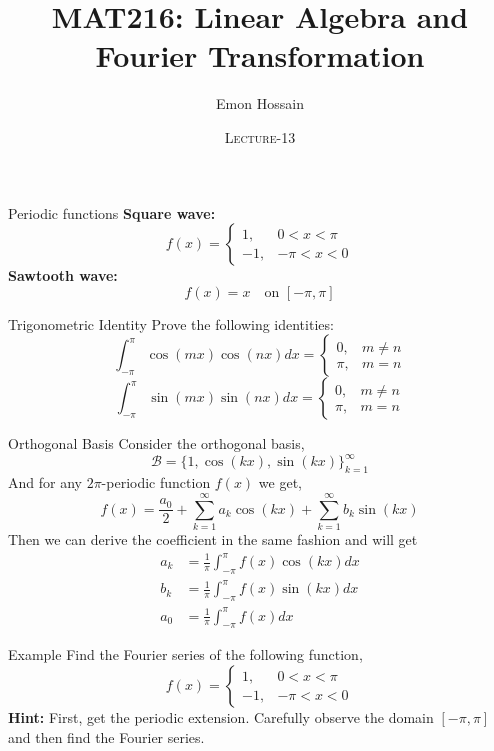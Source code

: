 \documentclass[11pt]{beamer}
\author[] %
{Emon Hossain\inst{1}}
\institute[University of Dhaka] %
{
  \inst{1}%
  Lecturer\\MNS department\\Brac University
}
\date[] %
{\textsc{Lecture-13}}
\title[]{MAT216: Linear Algebra and Fourier Transformation}
\theoremstyle{plain}
\begin{document}
\begin{frame}
\titlepage
\end{frame}


\begin{frame}{Periodic functions}
\textbf{Square wave:}
  $$
  f(x) = \begin{cases}1, & 0 < x < \pi \\ -1, & -\pi < x < 0 \end{cases}
  $$
\textbf{Sawtooth wave:}
  $$
  f(x) = x \quad \text{on } [-\pi,\pi]
  $$
\end{frame}

\begin{frame}{Trigonometric Identity}
Prove the following identities:
    $$
    \int_{-\pi}^\pi \cos(mx)\cos(nx)dx=\begin{cases}
        0,&m\neq n\\
        \pi, & m=n
    \end{cases}
    $$
    $$
    \int_{-\pi}^\pi \sin(mx)\sin(nx)dx=\begin{cases}
        0,&m\neq n\\
        \pi, & m=n
    \end{cases}
    $$
\end{frame}

\begin{frame}{Orthogonal Basis}
    Consider the orthogonal basis, $$\mathcal B=\{1,\cos(kx),\sin(kx)\}_{k=1}^\infty$$
    And for any $2\pi$-periodic function $f(x)$ we get,
    $$
    f(x)=\frac{a_0}{2}+\sum_{k=1}^\infty a_k\cos(kx)+\sum_{k=1}^\infty b_k \sin(kx)
    $$
    Then we can derive the coefficient in the same fashion and will get
    \begin{align*}
        a_k &= \frac{1}{\pi} \int_{-\pi}^\pi f(x)\cos(kx) dx\\
        b_k &= \frac{1}{\pi} \int_{-\pi}^\pi f(x)\sin(kx) dx\\
        a_0 &= \frac{1}{\pi} \int_{-\pi}^\pi f(x) dx
    \end{align*}
\end{frame}

\begin{frame}{Example}
    Find the Fourier series of the following function,
    $$
    f(x)= \begin{cases}
        1, &0<x<\pi\\
        -1, & -\pi<x<0
    \end{cases}
    $$
    \textbf{Hint:} First, get the periodic extension. Carefully observe the domain $[-\pi,\pi]$ and then find the Fourier series. 
\end{frame}
\end{document}
